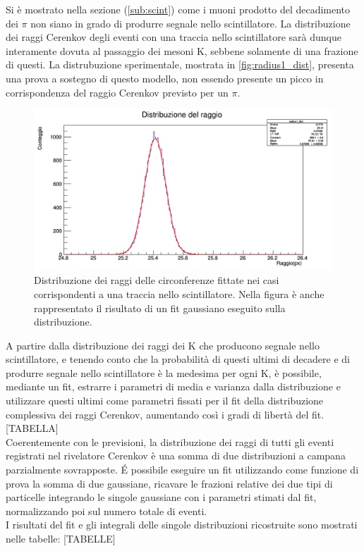 \documentclass[8pt]{extarticle}
\begin{document}
Si è mostrato nella sezione (\ref{sub:scint}) come i muoni prodotto del decadimento dei $\pi$ non siano in grado di produrre segnale nello scintillatore. La distribuzione dei raggi Cerenkov degli eventi con una traccia nello scintillatore sarà dunque interamente dovuta al passaggio dei mesoni K, sebbene solamente di una frazione di questi. La distrubuzione sperimentale, mostrata in \ref{fig:radius1_dist}, presenta una prova a sostegno di questo modello, non essendo presente un picco in corrispondenza del raggio Cerenkov previsto per un $\pi$. \\

\begin{figure}
\begin{center}
\includegraphics[scale=0.4]{radius1_dist}
\caption{Distribuzione dei raggi delle circonferenze fittate nei casi corrispondenti a una traccia nello scintillatore. Nella figura è anche rappresentato il risultato di un fit gaussiano eseguito sulla distribuzione.}
\label{radius1_dist}
\end{center}
\end{figure}

A partire dalla distribuzione dei raggi dei K che producono segnale nello scintillatore, e tenendo conto che la probabilità di questi ultimi di decadere e di produrre segnale nello scintillatore è la medesima per ogni K, è possibile, mediante un fit, estrarre i parametri di media e varianza dalla distribuzione e utilizzare questi ultimi come parametri fissati per il fit della distribuzione complessiva dei raggi Cerenkov, aumentando così i gradi di libertà del fit.
[TABELLA]
\\
Coerentemente con le previsioni, la distribuzione dei raggi di tutti gli eventi registrati nel rivelatore Cerenkov è una somma di due distribuzioni a campana parzialmente sovrapposte. \'E possibile eseguire un fit utilizzando come funzione di prova la somma di due gaussiane, ricavare le frazioni relative dei due tipi di particelle integrando le singole gaussiane con i parametri stimati dal fit, normalizzando poi sul numero totale di eventi.\\
I risultati del fit e gli integrali delle singole distribuzioni ricostruite sono mostrati nelle tabelle:
[TABELLE]
\end{document}
